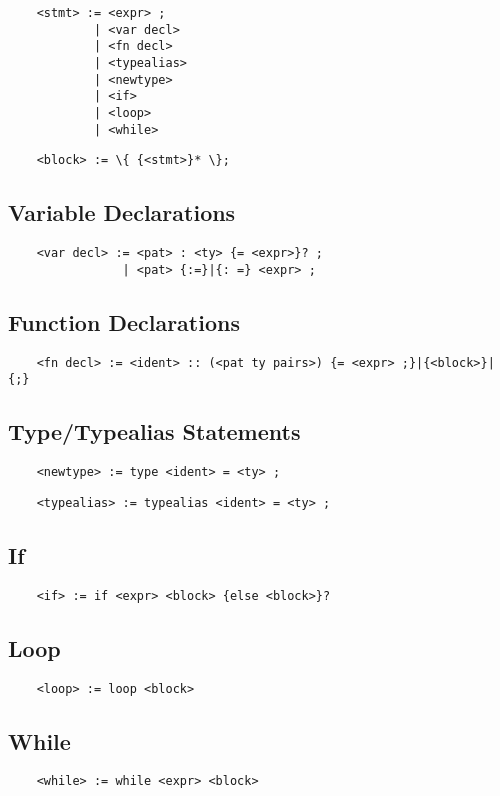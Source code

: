 \documentclass[a4paper]{article}
\begin{document}
\begin{verbatim}
    <stmt> := <expr> ;
            | <var decl>
            | <fn decl>
            | <typealias>
            | <newtype>
            | <if>
            | <loop>
            | <while>
\end{verbatim}

\begin{verbatim}
    <block> := \{ {<stmt>}* \};
\end{verbatim}

\subsection{Variable Declarations}

\begin{verbatim}
    <var decl> := <pat> : <ty> {= <expr>}? ;
                | <pat> {:=}|{: =} <expr> ;
\end{verbatim}

\subsection{Function Declarations}

\begin{verbatim}
    <fn decl> := <ident> :: (<pat ty pairs>) {= <expr> ;}|{<block>}|{;}
\end{verbatim}

\subsection{Type/Typealias Statements}

\begin{verbatim}
    <newtype> := type <ident> = <ty> ;
\end{verbatim}

\begin{verbatim}
    <typealias> := typealias <ident> = <ty> ;
\end{verbatim}

\subsection{If}

\begin{verbatim}
    <if> := if <expr> <block> {else <block>}?
\end{verbatim}

\subsection{Loop}

\begin{verbatim}
    <loop> := loop <block>
\end{verbatim}

\subsection{While}

\begin{verbatim}
    <while> := while <expr> <block>
\end{verbatim}
\end{document}
